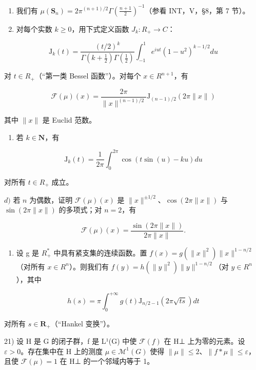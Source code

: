 \begin{enumerate}
\def\labelenumi{\alph{enumi})}
\item
  我们有 \(\mu (\mathbf{S}_n) = 2\pi^{(n + 1) / 2}\Gamma (\frac{n + 1}{2})^{-1}\)（参看 INT，V，§8，第 7 节）。
\item
  对每个实数 \(k \geqslant 0\)，用下式定义函数 \(J_{k} \colon R_{+} \to C\)：
\end{enumerate}

\[
\mathrm{J} _ {k} (t) = \frac {(t / 2) ^ {k}}{\Gamma (k + \frac {1}{2}) \Gamma (\frac {1}{2})} \int_ {- 1} ^ {1} e ^ {i u t} (1 - u ^ {2}) ^ {k - 1 / 2} d u
\]

对 \(t \in R_{+}\)（“第一类 Bessel 函数”）。对每个 \(x \in R^{n+1}\)，有

\[
\mathcal {F} (\mu) (x) = \frac {2 \pi}{\| x \| ^ {(n - 1) / 2}} \mathrm{J} _ {(n - 1) / 2} (2 \pi \| x \|)
\]

其中 \(\|x\|\) 是 Euclid 范数。

\begin{enumerate}
\def\labelenumi{\alph{enumi})}
\setcounter{enumi}{2}
\tightlist
\item
  若 \(k\in \mathbf{N}\)，有
\end{enumerate}

\[
\mathrm{J} _ {k} (t) = \frac {1}{2 \pi} \int_ {0} ^ {2 \pi} \cos (t \sin (u) - k u) d u
\]

对所有 \(t \in R_{+}\) 成立。

\(d)\) 若 \(n\) 为偶数，证明 \(\mathcal{F}(\mu)(x)\) 是 \(\| x\|^{\pm 1/2}\)、\(\cos(2\pi \| x\|)\) 与 \(\sin(2\pi \| x\|)\) 的多项式；对 \(n=2\)，有

\[
\mathcal {F} (\mu) (x) = \frac {\sin (2 \pi \| x \|)}{2 \pi \| x \|}.
\]

\begin{enumerate}
\def\labelenumi{\alph{enumi})}
\setcounter{enumi}{4}
\tightlist
\item
  设 g 是 \(R_{+}^{*}\) 中具有紧支集的连续函数。置 \(f(x) = g(\|x\|^{2}) \|x\|^{1-n/2}\)（对所有 \(x \in R^{n}\)）。则我们有 \(\widehat{f}(y) = h(\|y\|^{2}) \|y\|^{1-n/2}\)（对 \(y \in R^{n}\)），其中
\end{enumerate}

\[
h (s) = \pi \int_ {0} ^ {+ \infty} g (t) \mathrm{J} _ {n / 2 - 1} (2 \pi \sqrt {t s}) d t
\]

对所有 \(s \in \mathbf{R}_{+}\)（“Hankel 变换”）。

21) 设 H 是 G 的闭子群，f 是 L¹(G) 中使 \(\mathcal{F}(f)\) 在 H⊥ 上为零的元素。设 \(\varepsilon > 0\)。存在集中在 H 上的测度 \(\mu \in \mathcal{M}^1(G)\) 使得 \(\| \mu \| \leqslant 2\)、\(\| f * \mu \| \leqslant \varepsilon\)，且使 \(\mathcal{F}(\mu) = 1\) 在 H⊥ 的一个邻域内等于 1。

